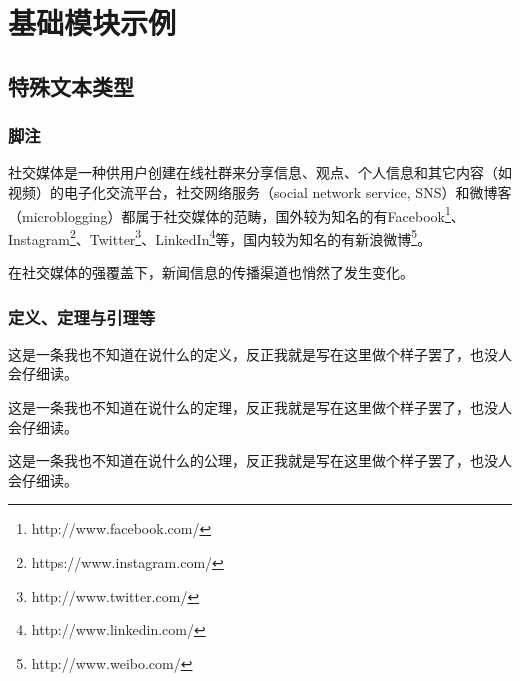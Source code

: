 \documentclass[a4paper,AutoFakeBold,oneside,12pt]{book}
\begin{document}
\newpage\mainmatter


\chapter{基础模块示例}


\section{特殊文本类型}
\subsection{脚注}
社交媒体是一种供用户创建在线社群来分享信息、观点、个人信息和其它内容（如视频）的电子化交流平台，社交网络服务（social network service, SNS）和微博客（microblogging）都属于社交媒体的范畴\cite{webster_social_media}，国外较为知名的有Facebook\footnote{http://www.facebook.com/}、Instagram\footnote{https://www.instagram.com/}、Twitter\footnote{http://www.twitter.com/}、LinkedIn\footnote{http://www.linkedin.com/}等，国内较为知名的有新浪微博\footnote{http://www.weibo.com/}。

在社交媒体的强覆盖下，新闻信息的传播渠道也悄然了发生变化。\cite{false_news_spread_2018}

\subsection{定义、定理与引理等}
\begin{definition}
这是一条我也不知道在说什么的定义，反正我就是写在这里做个样子罢了，也没人会仔细读。\cite{周兴2017基于深度学习的谣言检测及模式挖掘}
\end{definition}

\begin{theorem}
这是一条我也不知道在说什么的定理，反正我就是写在这里做个样子罢了，也没人会仔细读。
\end{theorem}

\begin{axiom}
这是一条我也不知道在说什么的公理，反正我就是写在这里做个样子罢了，也没人会仔细读。
\end{axiom}
\end{document}
